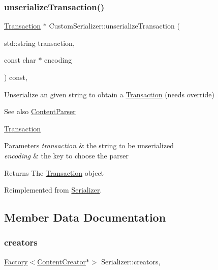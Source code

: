 \subsubsection{\texorpdfstring{unserialize\+Transaction()}{unserializeTransaction()}}
{\footnotesize\ttfamily \mbox{\hyperlink{classTransaction}{Transaction}} $\ast$ Custom\+Serializer\+::unserialize\+Transaction (\begin{DoxyParamCaption}\item[{std\+::string}]{transaction,  }\item[{const char $\ast$}]{encoding }\end{DoxyParamCaption}) const\hspace{0.3cm}{\ttfamily [override]}, {\ttfamily [virtual]}}

Unserialize an given string to obtain a \mbox{\hyperlink{classTransaction}{Transaction}} (needs override) \begin{DoxySeeAlso}{See also}
\mbox{\hyperlink{classContentParser}{Content\+Parser}} 

\mbox{\hyperlink{classTransaction}{Transaction}}
\end{DoxySeeAlso}

\begin{DoxyParams}{Parameters}
{\em transaction} & the string to be unserialized \\
\hline
{\em encoding} & the key to choose the parser \\
\hline
\end{DoxyParams}
\begin{DoxyReturn}{Returns}
The \mbox{\hyperlink{classTransaction}{Transaction}} object 
\end{DoxyReturn}


Reimplemented from \mbox{\hyperlink{classSerializer_ab5fa979a8486be6f49ad10f4810509d7}{Serializer}}.



\subsection{Member Data Documentation}
\mbox{\label{classSerializer_a7d26e865966b304350653b1246ec3340}} 
\subsubsection{\texorpdfstring{creators}{creators}}
{\footnotesize\ttfamily \mbox{\hyperlink{classFactory}{Factory}}$<$\mbox{\hyperlink{classContentCreator}{Content\+Creator}}$\ast$$>$ Serializer\+::creators\hspace{0.3cm}{\ttfamily [protected]}, {\ttfamily [inherited]}}

